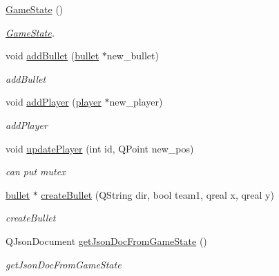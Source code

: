\begin{DoxyCompactItemize}
\item 
\hyperlink{class_game_state_a4fa0a2bf50315c4a35a3890a0adcee5c}{Game\+State} ()\hypertarget{class_game_state_a4fa0a2bf50315c4a35a3890a0adcee5c}{}\label{class_game_state_a4fa0a2bf50315c4a35a3890a0adcee5c}

\begin{DoxyCompactList}\small\item\em \hyperlink{class_game_state}{Game\+State}. \end{DoxyCompactList}\item 
void \hyperlink{class_game_state_a177a1737560a43cb59868c67c20a8c0c}{add\+Bullet} (\hyperlink{classbullet}{bullet} $\ast$new\+\_\+bullet)
\begin{DoxyCompactList}\small\item\em add\+Bullet \end{DoxyCompactList}\item 
void \hyperlink{class_game_state_ad5e3de1d73d145b5ecefbbbef003039e}{add\+Player} (\hyperlink{classplayer}{player} $\ast$new\+\_\+player)
\begin{DoxyCompactList}\small\item\em add\+Player \end{DoxyCompactList}\item 
void \hyperlink{class_game_state_a134fbf858b0d2bf7159ac32e1106fef3}{update\+Player} (int id, Q\+Point new\+\_\+pos)
\begin{DoxyCompactList}\small\item\em can put mutex \end{DoxyCompactList}\item 
\hyperlink{classbullet}{bullet} $\ast$ \hyperlink{class_game_state_aa2f6ea0dc7a423f875f0266da6b33dc3}{create\+Bullet} (Q\+String dir, bool team1, qreal x, qreal y)
\begin{DoxyCompactList}\small\item\em create\+Bullet \end{DoxyCompactList}\item 
Q\+Json\+Document \hyperlink{class_game_state_a9bc4de2fc56f9a29b386d7ef502e743d}{get\+Json\+Doc\+From\+Game\+State} ()
\begin{DoxyCompactList}\small\item\em get\+Json\+Doc\+From\+Game\+State \end{DoxyCompactList}\end{DoxyCompactItemize}
